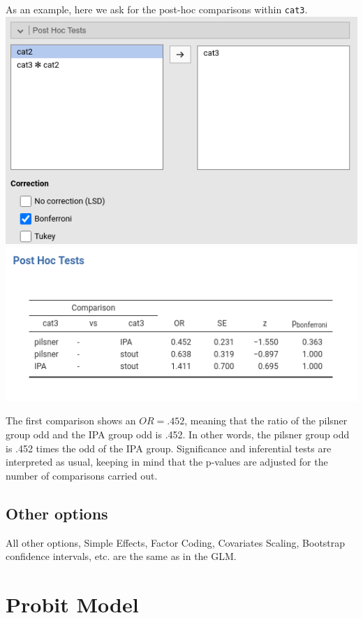 \documentclass[
]{book}
\begin{document}
As an example, here we ask for the post-hoc comparisons within \texttt{cat3}.
\includegraphics{bookletpics/3_logistic_input9.png}
\includegraphics{bookletpics/3_logistic_output12.png}

The first comparison shows an \(OR=.452\), meaning that the ratio of the pilsner group odd and the IPA group odd is .452. In other words, the pilsner group odd is .452 times the odd of the IPA group. Significance and inferential tests are interpreted as usual, keeping in mind that the p-values are adjusted for the number of comparisons carried out.

\hypertarget{other-options}{%
\subsection{Other options}\label{other-options}}

All other options, {Simple Effects}, {Factor Coding}, {Covariates Scaling}, {Bootstrap} confidence intervals, etc. are the same as in the GLM.

\hypertarget{probit}{%
\section{Probit Model}\label{probit}}
\end{document}
